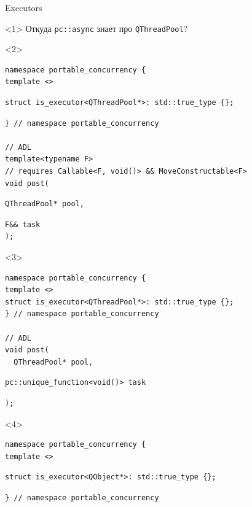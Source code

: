 \documentclass[aspectratio=169,hyperref={unicode},17pt]{beamer}
\begin{document}
\begin{frame}[fragile,t]{Executors}
\begin{onlyenv}<1>
Откуда \texttt{pc::async} знает про \texttt{QThreadPool}?
\end{onlyenv}
\begin{onlyenv}<2>
\begin{lstlisting}[style=cppcode,aboveskip=0pt,belowskip=0pt]
namespace portable_concurrency {
template <>
\end{lstlisting}
\begin{lstlisting}[style=cppcode,backgroundcolor=\color{gray!30},aboveskip=0pt,belowskip=0pt]
struct is_executor<QThreadPool*>: std::true_type {};
\end{lstlisting}
\begin{lstlisting}[style=cppcode,aboveskip=0pt,belowskip=0pt]
} // namespace portable_concurrency

// ADL
template<typename F>
// requires Callable<F, void()> && MoveConstructable<F>
void post(
\end{lstlisting}
\begin{lstlisting}[style=cppcode,backgroundcolor=\color{gray!30},aboveskip=0pt,belowskip=0pt]
  QThreadPool* pool,
\end{lstlisting}
\begin{lstlisting}[style=cppcode,aboveskip=0pt,belowskip=0pt]
  F&& task
);
\end{lstlisting}
\end{onlyenv}
\begin{onlyenv}<3>
\begin{lstlisting}[style=cppcode,aboveskip=0pt,belowskip=0pt]
namespace portable_concurrency {
template <>
struct is_executor<QThreadPool*>: std::true_type {};
} // namespace portable_concurrency

// ADL
void post(
  QThreadPool* pool,
\end{lstlisting}
\begin{lstlisting}[style=cppcode,backgroundcolor=\color{gray!30},aboveskip=0pt,belowskip=0pt]
  pc::unique_function<void()> task
\end{lstlisting}
\begin{lstlisting}[style=cppcode,aboveskip=0pt,belowskip=0pt]
);
\end{lstlisting}
\end{onlyenv}
\begin{onlyenv}<4>
\begin{lstlisting}[style=cppcode,aboveskip=0pt,belowskip=0pt]
namespace portable_concurrency {
template <>
\end{lstlisting}
\begin{lstlisting}[style=cppcode,backgroundcolor=\color{gray!30},aboveskip=0pt,belowskip=0pt]
struct is_executor<QObject*>: std::true_type {};
\end{lstlisting}
\begin{lstlisting}[style=cppcode,aboveskip=0pt,belowskip=0pt]
} // namespace portable_concurrency


\end{lstlisting}
\end{onlyenv}
\end{frame}
\end{document}
